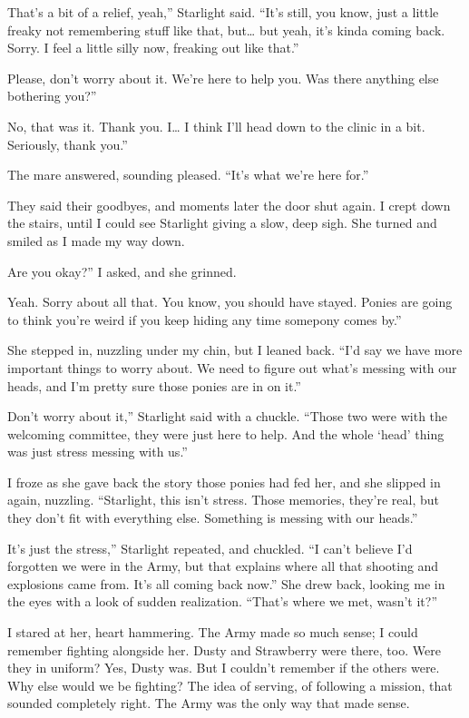 \leavevmode{}That’s a bit of a relief, yeah,” Starlight said. “It’s still, you know, just a little freaky not remembering stuff like that, but… but yeah, it’s kinda coming back. Sorry. I feel a little silly now, freaking out like that.”

\leavevmode{}Please, don’t worry about it. We’re here to help you. Was there anything else bothering you?”

\leavevmode{}No, that was it. Thank you. I… I think I’ll head down to the clinic in a bit. Seriously, thank you.”

The mare answered, sounding pleased. “It’s what we’re here for.”

They said their goodbyes, and moments later the door shut again. I crept down the stairs, until I could see Starlight giving a slow, deep sigh. She turned and smiled as I made my way down.

\leavevmode{}Are you okay?” I asked, and she grinned.

\leavevmode{}Yeah. Sorry about all that. You know, you should have stayed. Ponies are going to think you’re weird if you keep hiding any time somepony comes by.”

She stepped in, nuzzling under my chin, but I leaned back. “I’d say we have more important things to worry about. We need to figure out what’s messing with our heads, and I’m pretty sure those ponies are in on it.”

\leavevmode{}Don’t worry about it,” Starlight said with a chuckle. “Those two were with the welcoming committee, they were just here to help. And the whole ‘head’ thing was just stress messing with us.”

I froze as she gave back the story those ponies had fed her, and she slipped in again, nuzzling. “Starlight, this isn’t stress. Those memories, they’re real, but they don’t fit with everything else. Something is messing with our heads.”

\leavevmode{}It’s just the stress,” Starlight repeated, and chuckled. “I can’t believe I’d forgotten we were in the Army, but that explains where all that shooting and explosions came from. It’s all coming back now.” She drew back, looking me in the eyes with a look of sudden realization. “That’s where we met, wasn’t it?”

I stared at her, heart hammering. The Army made so much sense; I could remember fighting alongside her. Dusty and Strawberry were there, too. Were they in uniform? Yes, Dusty was. But I couldn’t remember if the others were. Why else would we be fighting? The idea of serving, of following a mission, that sounded completely right. The Army was the only way that made sense.

